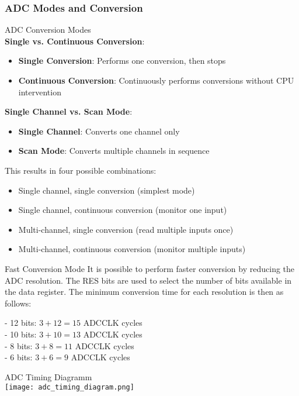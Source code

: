 \subsubsection{ADC Modes and Conversion}

\begin{definition}{ADC Conversion Modes}\\
\textbf{Single vs. Continuous Conversion}:
\begin{itemize}
    \item \textbf{Single Conversion}: Performs one conversion, then stops
    \item \textbf{Continuous Conversion}: Continuously performs conversions without CPU intervention
\end{itemize}
\textbf{Single Channel vs. Scan Mode}:
\begin{itemize}
    \item \textbf{Single Channel}: Converts one channel only
    \item \textbf{Scan Mode}: Converts multiple channels in sequence
\end{itemize}
This results in four possible combinations:
\begin{itemize}
    \item Single channel, single conversion (simplest mode)
    \item Single channel, continuous conversion (monitor one input)
    \item Multi-channel, single conversion (read multiple inputs once)
    \item Multi-channel, continuous conversion (monitor multiple inputs)
\end{itemize}
\end{definition}



\begin{theorem}{Fast Conversion Mode}
    It is possible to perform faster conversion by reducing the ADC resolution. The RES bits are used to select the number of bits available in the data register. The minimum conversion time for each resolution is then as follows:

- 12 bits: $3+12=15$ ADCCLK cycles\\
- 10 bits: $3+10=13$ ADCCLK cycles\\
- 8 bits: $3+8=11$ ADCCLK cycles\\
- 6 bits: $3+6=9$ ADCCLK cycles
\end{theorem}

\begin{KR}{ADC Timing Diagramm}\\
    \texttt{[image: adc\_timing\_diagram.png]}
\end{KR}

